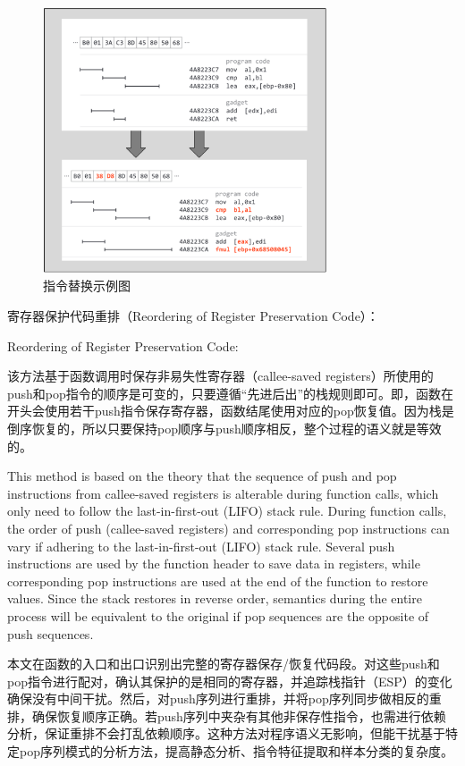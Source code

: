 \begin{figure}[hbt]
	\centering
	\includegraphics[width=0.75\textwidth]{figures/4.2}
	\caption{指令替换示例图}\label{fig:4.2}
\end{figure}

寄存器保护代码重排（Reordering of Register Preservation Code）：

Reordering of Register Preservation Code:

该方法基于函数调用时保存非易失性寄存器（callee-saved registers）所使用的push和pop指令的顺序是可变的，只要遵循“先进后出”的栈规则即可。即，函数在开头会使用若干push指令保存寄存器，函数结尾使用对应的pop恢复值。因为栈是倒序恢复的，所以只要保持pop顺序与push顺序相反，整个过程的语义就是等效的。

This method is based on the theory that the sequence of push and pop instructions from callee-saved registers is alterable during function calls, which only need to follow the last-in-first-out (LIFO) stack rule. During function calls, the order of push (callee-saved registers) and corresponding pop instructions can vary if adhering to the last-in-first-out (LIFO) stack rule. Several push instructions are used by the function header to save data in registers, while corresponding pop instructions are used at the end of the function to restore values. Since the stack restores in reverse order, semantics during the entire process will be equivalent to the original if pop sequences are the opposite of push sequences.

本文在函数的入口和出口识别出完整的寄存器保存/恢复代码段。对这些push和pop指令进行配对，确认其保护的是相同的寄存器，并追踪栈指针（ESP）的变化确保没有中间干扰。然后，对push序列进行重排，并将pop序列同步做相反的重排，确保恢复顺序正确。若push序列中夹杂有其他非保存性指令，也需进行依赖分析，保证重排不会打乱依赖顺序。这种方法对程序语义无影响，但能干扰基于特定pop序列模式的分析方法，提高静态分析、指令特征提取和样本分类的复杂度。

